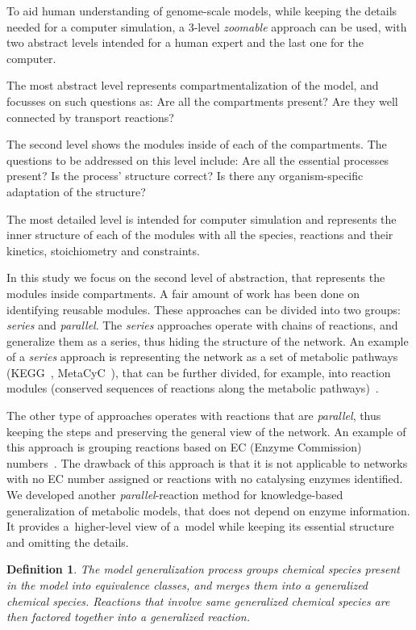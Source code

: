 \documentclass[9pt]{article}
\newcounter{def}
\newcounter{rm}
\begin{document}
To aid human understanding of genome-scale models, while keeping the details needed for a computer simulation, a 3-level \emph{zoomable} approach can be used, with two abstract levels intended for a human expert and the last one for the computer. 

The most abstract level represents compartmentalization of the model, and focusses on such questions as: Are all the compartments present? Are they well connected by transport reactions? 

The second level shows the modules inside of each of the compartments. The questions to be addressed on this level include: Are all the essential processes present? Is the process' structure correct? Is there any organism-specific adaptation of the structure?

The most detailed level is intended for computer simulation and represents the inner structure of each of the modules with all the species, reactions and their kinetics, stoichiometry and constraints.

In this study we focus on the second level of abstraction, that represents the modules inside compartments. A fair amount of work has been done on identifying reusable modules. These approaches can be divided into two groups: \emph{series} and \emph{parallel}. The \emph{series} approaches operate with chains of reactions, and generalize them as a series, thus hiding the structure of the network. An example of a \emph{series} approach is representing the network as a set of metabolic pathways (KEGG~\citep{Kanehisa12}, MetaCyC~\citep{Caspi2012}), that can be further divided, for example, into reaction modules (conserved sequences of reactions along the metabolic pathways)~\citep{Muto2013}. 

The other type of approaches operates with reactions that are \emph{parallel}, thus keeping the steps and preserving the general view of the network. An example of this approach is grouping reactions based on EC (Enzyme Commission) numbers~\citep{Tohsato2000}. The drawback of this approach is that it is not applicable to networks with no EC number assigned or reactions with no catalysing enzymes identified. 
We developed another \emph{parallel}-reaction method for knowledge-based generalization of metabolic models, that does not depend on enzyme information. It provides a~higher-level view of a~model while keeping its essential structure and omitting the details. 


\newtheorem{eq00}[def]{Definition}
\begin{eq00}
The \emph{model generalization} process groups chemical species present in the model into equivalence classes, and merges them into a generalized chemical species. Reactions that involve same generalized chemical species are then factored together into a generalized reaction. 
\end{eq00}
\end{document}
